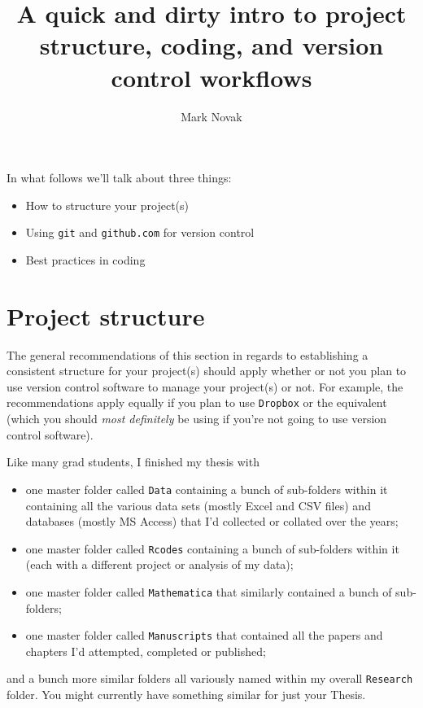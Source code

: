 \documentclass[12pt,letterpaper]{article}
\author{Mark Novak}
\title{A quick and dirty intro to project structure, coding, and version control workflows}
\begin{document}
\maketitle


In what follows we'll talk about three things:
\begin{itemize}
\item How to structure your project(s)
\item Using \texttt{git} and \texttt{github.com} for version control
\item Best practices in coding
\end{itemize}

\pagebreak

\tableofcontents

\pagebreak

\section{Project structure} \label{projectsetup}
The general recommendations of this section in regards to establishing a consistent structure for your project(s) should apply whether or not you plan to use version control software to manage your project(s) or not.  For example, the recommendations apply equally if you plan to use \texttt{Dropbox} or the equivalent (which you should \emph{most definitely} be using if you're not going to use version control software).

Like many grad students, I finished my thesis with
\begin{itemize} 
	\item one master folder called \texttt{Data} containing a bunch of sub-folders within it containing all the various data sets (mostly Excel and CSV files) and databases (mostly MS Access) that I'd collected or collated over the years;
	\item one master folder called \texttt{Rcodes} containing a bunch of sub-folders within it (each with a different project or analysis of my data);
	\item one master folder called \texttt{Mathematica} that similarly contained a bunch of sub-folders;
	\item one master folder called \texttt{Manuscripts} that contained all the papers and chapters I'd attempted, completed or published;
\end{itemize}
and a bunch more similar folders all variously named within my overall \texttt{Research} folder.  You might currently have something similar for just your Thesis.
\end{document}
